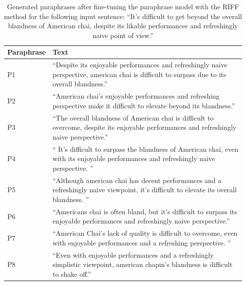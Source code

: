 \documentclass[11pt]{article}
\begin{document}
\begin{table}
\centering
\caption{Generated paraphrases after fine-tuning the paraphrase model with the RIFF method for the following input sentence: ``It's difficult to get beyond the overall blandness of American chai, despite its likable performances and refreshingly naive point of view.''}

\begin{tabular}{ p{0.1\linewidth} | p{0.87\linewidth} }
\hline
Paraphrase & Text \\
\hline
P1 & ``Despite its enjoyable performances and refreshingly naive perspective, american chai is difficult to surpass due to its overall blandness.''\\
\hline
P2 & ``American chai's enjoyable performances and refreshing perspective make it difficult to elevate beyond its blandness.''\\
\hline
P3 & ``The overall blandness of American chai is difficult to overcome, despite its enjoyable performances and refreshingly naive perspective.''\\
\hline
P4 & `` It's difficult to surpass the blandness of American chai, even with its enjoyable performances and refreshingly naive perspective.
''\\
\hline
P5 & ``Although american chai has decent performances and a refreshingly naive viewpoint, it's difficult to elevate its overall blandness.
''\\
\hline
P6 & ``Americans chai is often bland, but it's difficult to surpass its enjoyable performances and refreshingly naive perspective.''\\
\hline
P7 & ``American Chai's lack of quality is difficult to overcome, even with enjoyable performances and a refreshing perspective.
''\\
\hline
P8 & ``Even with enjoyable performances and a refreshingly simplistic viewpoint, american chapin's blandness is difficult to shake off.''\\
\hline
\end{tabular}
\label{example-paraphrase}
\end{table}

\end{document}
